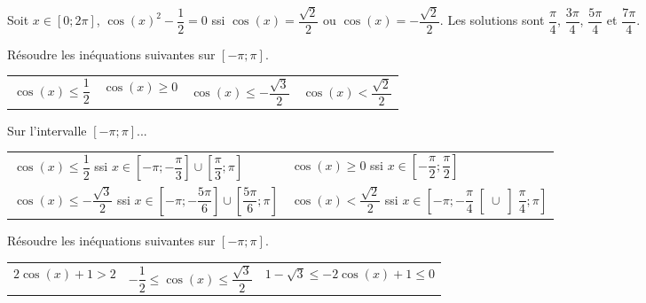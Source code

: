 \documentclass[11pt,fleqn, openany]{book} %
\begin{document}
\begin{solution}Soit $x\in[0;2\pi]$, $\cos(x)^2-\dfrac{1}{2}=0$ ssi $\cos(x)=\dfrac{\sqrt{2}}{2}$ ou $\cos(x)=-\dfrac{\sqrt{2}}{2}$. Les solutions sont $\dfrac{\pi}{4}$, $\dfrac{3\pi}{4}$, $\dfrac{5\pi}{4}$ et $\dfrac{7\pi}{4}$.\end{solution}




\begin{exercise}Résoudre les inéquations suivantes sur $[-\pi;\pi]$.
\vspace{-0.2cm}

\begin{tabularx}{\linewidth}{XXXX}
$\cos (x) \leqslant \dfrac{1}{2}$ & $\cos (x) \geqslant 0$ & $\cos (x) \leqslant -\dfrac{\sqrt{3}}{2}$ & $\cos (x) < \dfrac{\sqrt{2}}{2}$\\
\end{tabularx}\end{exercise}

\begin{solution}Sur l'intervalle $[-\pi;\pi]$...

\begin{tabularx}{\linewidth}{XX}
$\cos (x) \leqslant \dfrac{1}{2}$ ssi $x \in \left[-\pi ; -\dfrac{\pi}{3}\right] \cup \left[\dfrac{\pi}{3};\pi\right]$ & $\cos (x) \geqslant 0$ ssi $x \in \left[-\dfrac{\pi}{2};\dfrac{\pi}{2}\right]$ \\ $\cos (x) \leqslant -\dfrac{\sqrt{3}}{2}$ ssi $x \in \left[-\pi ; -\dfrac{5\pi}{6}\right] \cup \left[\dfrac{5\pi}{6};\pi\right]$ & $\cos (x) < \dfrac{\sqrt{2}}{2}$ ssi $x \in \left[-\pi ; -\dfrac{\pi}{4}\right[ \cup \left]\dfrac{\pi}{4};\pi\right]$\\
\end{tabularx}\end{solution}



\begin{exercise}Résoudre les inéquations suivantes sur $[-\pi;\pi]$.
\vspace{-0.2cm}

\begin{tabularx}{\linewidth}{XXX}

$2\cos(x)+1 > 2$ & $-\dfrac{1}{2} \leqslant \cos(x) \leqslant \dfrac{\sqrt{3}}{2}$ & $   1-\sqrt{3} \leqslant -2\cos(x)+1 \leqslant 0$
\end{tabularx}\end{exercise}
\end{document}
